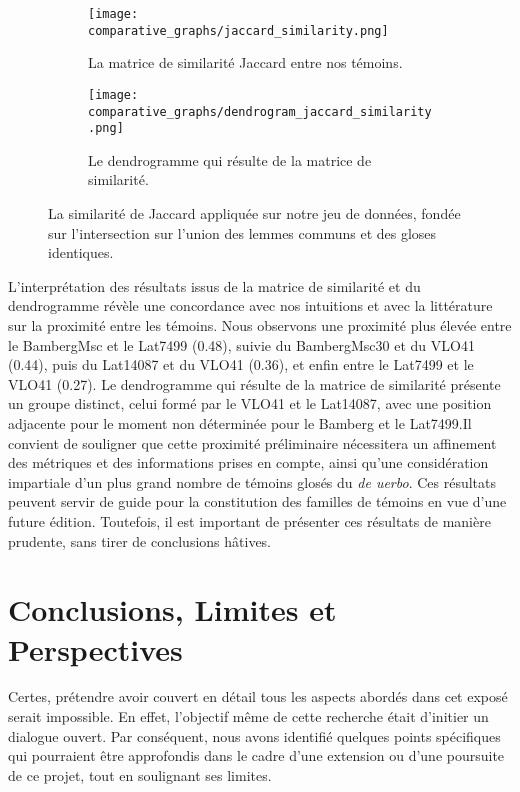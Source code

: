 \documentclass[a4paper, twoside, 12pt]{book}
\begin{document}
{\begin{figure}[H]
    \centering
    \begin{subfigure}{0.40\textwidth}
        \texttt{[image: comparative\_graphs/jaccard\_similarity.png]}
        \caption{La matrice de similarité Jaccard entre nos témoins.}
    \end{subfigure}
    \hfill %
    \begin{subfigure}{0.40\textwidth}
        \texttt{[image: comparative\_graphs/dendrogram\_jaccard\_similarity.png]}
        \caption{Le dendrogramme qui résulte de la matrice de similarité.}
    \end{subfigure}
    \caption{La similarité de Jaccard appliquée sur notre jeu de données, fondée sur l'intersection sur l'union des lemmes communs et des gloses identiques. }
    \label{fig:jaccard}
\end{figure}

L'interprétation des résultats issus de la matrice de similarité et du dendrogramme révèle une concordance avec nos intuitions et avec la littérature sur la proximité entre les témoins. Nous observons une proximité plus élevée entre le BambergMsc et le Lat7499 (0.48), suivie du BambergMsc30 et du VLO41 (0.44), puis du Lat14087 et du VLO41 (0.36), et enfin entre le Lat7499 et le VLO41 (0.27). Le dendrogramme qui résulte de la matrice de similarité présente un groupe distinct, celui formé par le VLO41 et le Lat14087, avec une position adjacente pour le moment non déterminée pour le Bamberg et le Lat7499.Il convient de souligner que cette proximité préliminaire nécessitera un affinement des métriques et des informations prises en compte, ainsi qu'une considération impartiale d'un plus grand nombre de témoins glosés du \textit{de uerbo}. Ces résultats peuvent servir de guide pour la constitution des familles de témoins en vue d'une future édition. Toutefois, il est important de présenter ces résultats de manière prudente, sans tirer de conclusions hâtives.\\


\chapter{Conclusions, Limites et Perspectives}

Certes, prétendre avoir couvert en détail tous les aspects abordés dans cet exposé serait impossible. En effet, l'objectif même de cette recherche était d'initier un dialogue ouvert. Par conséquent, nous avons identifié quelques points spécifiques qui pourraient être approfondis dans le cadre d'une extension ou d'une poursuite de ce projet, tout en soulignant ses limites.\\


}
\end{document}
